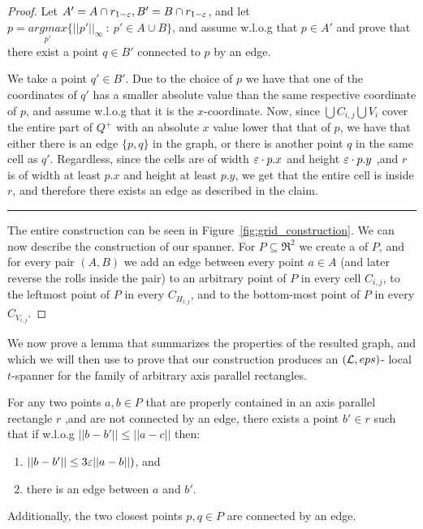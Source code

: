 \documentclass[12pt]{article}%
\begin{document}
\begin{proof}
    Let $A'=A\cap r_{1-\varepsilon}, B'=B \cap r_{1-\varepsilon}$, and let
    $p= \underset{p'}{argmax}\{||p'||_{\infty}~:~ p'\in A\cup B\}$,
    and assume w.l.o.g that $p\in A'$ and prove that there exist a
    point $q\in B'$ connected to $p$ by an edge.
    
    We take a point $q'\in B'$. Due to the choice of $p$ we have that
    one of the coordinates of $q'$ has a smaller absolute value than
    the same respective coordinate of $p$, and assume w.l.o.g that it
    is the $x$-coordinate. Now, since $\bigcup C_{i,j} \bigcup V_i$
    cover the entire part of $Q^+$ with an absolute $x$ value lower
    that that of $p$, we have that either there is an edge $\{p,q\}$
    in the graph, or there is another point $q$ in the same cell as
    $q'$. Regardless, since the cells are of width $\varepsilon\cdot p.x$ and
    height $\varepsilon\cdot p.y$ ,and $r$ is of width at least $p.x$ and
    height at least $p.y$, we get that the entire cell is inside $r$,
    and therefore there exists an edge as described in the claim.
    
    \hrule

    The entire construction can be seen in
    Figure~\ref{fig:grid_construction}. We can now describe the
    construction of our spanner. For $P\subseteq \Re^2$ we create a
    \QSPD of $P$, and for every pair $(A,B)$ we add an edge between
    every point $a\in A$ (and later reverse the rolls inside the pair)
    to an arbitrary point of $P$ in every cell $C_{i,j}$, to the
    leftmost point of $P$ in every $C_{H_{i,j}}$, and to the
    bottom-most point of $P$ in every $C_{V_{i,j}}$.
\end{proof}

We now prove a lemma that summarizes the properties of the resulted
graph, and which we will then use to prove that our construction
produces an $(\mathcal{L}, eps)$- local $t$-spanner for the family of
arbitrary axis parallel rectangles.


\begin{claim}
    \label{clm:span_properties}
    For any two points $a,b\in P$ that are properly contained in an
    axis parallel rectangle $r$ ,and are not connected by an edge,
    there exists a point $b'\in r$ such that if w.l.o.g
    $||b-b'|| \leq ||a-c||$ then:
    \begin{enumerate}
        \item $||b-b'|| \leq 3\varepsilon ||a-b||)$, and
        \item there is an edge between $a$ and $b'$.
    \end{enumerate}
    Additionally, the two closest points $p,q\in P$ are connected by
    an edge.
	
\end{claim}
\end{document}
